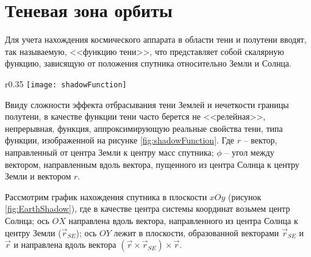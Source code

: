 \section{Теневая зона орбиты}
\noindent\indent Для учета нахождения космического аппарата в области тени и
полутени вводят, так называемую, <<функцию тени>>, что представляет собой
скалярную функцию, зависящую от положения спутника относительно Земли и Солнца.
\begin{wrapfigure}{r}{0.35\textwidth}
  \centering
  \texttt{[image: shadowFunction]}
  \caption{Функция тени}
  \label{fig:shadowFunction}
\end{wrapfigure}
Ввиду сложности эффекта отбрасывания тени Землей и нечеткости границы полутени,
в качестве функции тени часто берется не <<релейная>>, непрерывная, функция,
аппроксимирующую реальные свойства тени, типа функции, изображенной на
рисунке \ref{fig:shadowFunction}.
Где $r$ -- вектор, направленный от центра Земли к центру масс спутника; $\phi$
-- угол между вектором, направленным вдоль вектора, пущенного из центра Солнца к
центру Земли и вектором $r$.\par
Рассмотрим график нахождения спутника в плоскости $xOy$ (рисунок \ref{fig:EarthShadow}),
где в качестве центра системы координат возьмем центр Солнца; ось $OX$ направлена
вдоль вектора, направленного из центра Солнца к центру Земли ($\vec{r}_{SE}$);
ось $OY$ лежит в плоскости, образованной векторами $\vec{r}_{SE}$ и $\vec{r}$ и направлена
вдоль вектора $(\vec{r}\times\vec{r}_{SE})\times\vec{r}$.
